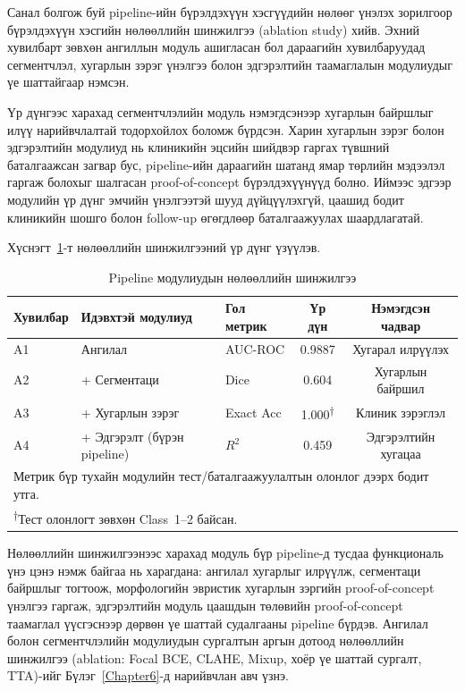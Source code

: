 Санал болгож буй pipeline-ийн бүрэлдэхүүн хэсгүүдийн нөлөөг үнэлэх зорилгоор бүрэлдэхүүн хэсгийн нөлөөллийн шинжилгээ (ablation study) хийв. Эхний хувилбарт зөвхөн ангиллын модуль ашигласан бол дараагийн хувилбаруудад сегментчлэл, хугарлын зэрэг үнэлгээ болон эдгэрэлтийн таамаглалын модулиудыг үе шаттайгаар нэмсэн.

Үр дүнгээс харахад сегментчлэлийн модуль нэмэгдсэнээр хугарлын байршлыг илүү нарийвчлалтай тодорхойлох боломж бүрдсэн. Харин хугарлын зэрэг болон эдгэрэлтийн модулиуд нь клиникийн эцсийн шийдвэр гаргах түвшний баталгаажсан загвар бус, pipeline-ийн дараагийн шатанд ямар төрлийн мэдээлэл гаргаж болохыг шалгасан proof-of-concept бүрэлдэхүүнүүд болно. Иймээс эдгээр модулийн үр дүнг эмчийн үнэлгээтэй шууд дүйцүүлэхгүй, цаашид бодит клиникийн шошго болон follow-up өгөгдлөөр баталгаажуулах шаардлагатай.

Хүснэгт~\ref{tab:ablation_modules}-т нөлөөллийн шинжилгээний үр дүнг үзүүлэв.

\begin{table}[!htbp]
\centering
\small
\begin{tabular}{l l l c c}
\toprule
\textbf{Хувилбар} & \textbf{Идэвхтэй модулиуд} & \textbf{Гол метрик} & \textbf{Үр дүн} & \textbf{Нэмэгдсэн чадвар} \\
\midrule
A1 & Ангилал                          & AUC-ROC   & 0.9887 & Хугарал илрүүлэх \\[3pt]
A2 & \quad + Сегментаци               & Dice      & 0.604  & Хугарлын байршил \\[3pt]
A3 & \quad + Хугарлын зэрэг           & Exact Acc & 1.000\textsuperscript{†}  & Клиник зэрэглэл \\[3pt]
A4 & \quad + Эдгэрэлт (бүрэн pipeline) & $R^2$     & 0.459  & Эдгэрэлтийн хугацаа \\
\bottomrule
\multicolumn{5}{l}{\footnotesize Метрик бүр тухайн модулийн тест/баталгаажуулалтын олонлог дээрх бодит утга.} \\
\multicolumn{5}{l}{\footnotesize\textsuperscript{†}Тест олонлогт зөвхөн Class~1--2 байсан.}
\end{tabular}
\caption{Pipeline модулиудын нөлөөллийн шинжилгээ}
\label{tab:ablation_modules}
\end{table}

Нөлөөллийн шинжилгээнээс харахад модуль бүр pipeline-д тусдаа функциональ үнэ цэнэ нэмж байгаа нь харагдана: ангилал хугарлыг илрүүлж, сегментаци байршлыг тогтоож, морфологийн эвристик хугарлын зэргийн proof-of-concept үнэлгээ гаргаж, эдгэрэлтийн модуль цаашдын төлөвийн proof-of-concept таамаглал үүсгэснээр дөрвөн үе шаттай судалгааны pipeline бүрдэв. Ангилал болон сегментчлэлийн модулиудын сургалтын аргын дотоод нөлөөллийн шинжилгээ (ablation: Focal BCE, CLAHE, Mixup, хоёр үе шаттай сургалт, TTA)-ийг Бүлэг~\ref{Chapter6}-д нарийвчлан авч үзнэ.
